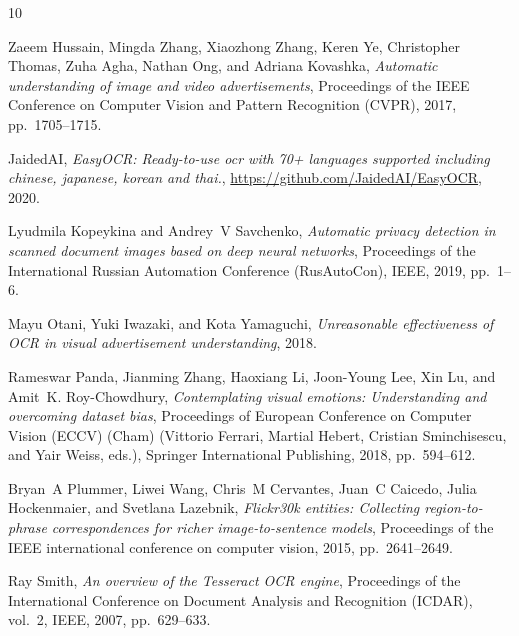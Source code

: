 \documentclass{zapiski}
\begin{document}
% 
% 

\providecommand{\bysame}{\leavevmode\hbox to3em{\hrulefill}\thinspace}
\providecommand{\MR}{\relax\ifhmode\unskip\space\fi MR }
\providecommand{\MRhref}[2]{%
  \href{http://www.ams.org/mathscinet-getitem?mr=#1}{#2}
}
\providecommand{\href}[2]{#2}
\begin{thebibliography}{10}


Zaeem Hussain, Mingda Zhang, Xiaozhong Zhang, Keren Ye, Christopher Thomas,
  Zuha Agha, Nathan Ong, and Adriana Kovashka, \emph{Automatic understanding of
  image and video advertisements}, Proceedings of the IEEE Conference on
  Computer Vision and Pattern Recognition (CVPR), 2017, pp.~1705--1715.


JaidedAI, \emph{{EasyOCR}: Ready-to-use ocr with 70+ languages supported
  including chinese, japanese, korean and thai.},
  \url{https://github.com/JaidedAI/EasyOCR}, 2020.


Lyudmila Kopeykina and Andrey~V Savchenko, \emph{Automatic privacy detection in
  scanned document images based on deep neural networks}, Proceedings of the
  International Russian Automation Conference (RusAutoCon), IEEE, 2019,
  pp.~1--6.


Mayu Otani, Yuki Iwazaki, and Kota Yamaguchi, \emph{Unreasonable effectiveness
  of {OCR} in visual advertisement understanding}, 2018.
  
  
Rameswar Panda, Jianming Zhang, Haoxiang Li, Joon-Young Lee, Xin Lu, and
  Amit~K. Roy-Chowdhury, \emph{Contemplating visual emotions: Understanding and
  overcoming dataset bias}, Proceedings of European Conference on Computer
  Vision (ECCV) (Cham) (Vittorio Ferrari, Martial Hebert, Cristian
  Sminchisescu, and Yair Weiss, eds.), Springer International Publishing, 2018,
  pp.~594--612.

Bryan~A Plummer, Liwei Wang, Chris~M Cervantes, Juan~C Caicedo, Julia
  Hockenmaier, and Svetlana Lazebnik, \emph{Flickr30k entities: Collecting
  region-to-phrase correspondences for richer image-to-sentence models},
  Proceedings of the IEEE international conference on computer vision, 2015,
  pp.~2641--2649.




Ray Smith, \emph{An overview of the {Tesseract} {OCR} engine}, Proceedings of
  the International Conference on Document Analysis and Recognition (ICDAR),
  vol.~2, IEEE, 2007, pp.~629--633.




\end{thebibliography}
\end{document}
